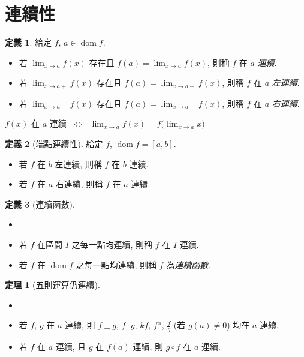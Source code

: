 \documentclass[12pt,a4paper]{extarticle}
\newcommand{\ds}{\displaystyle}
\newcommand{\ifff}{\;\Longleftrightarrow\;}
\DeclareMathOperator*{\dom}{dom}
\theoremstyle{definition}
\newtheorem*{dfn}{定義}
\newtheorem*{thm}{定理}
\begin{document}
\section*{連續性}

\begin{dfn} 給定 $f$, $a\in\dom f$. 
  \begin{itemize}\setlength\itemsep{0em}
    \item 若 $\ds\lim_{x\to a} f(x)$ 存在且 $\ds f(a)=\lim_{x\to a}f(x)$, 則稱 $f$ 在 $a$ \emph{連續}.  
    \item 若 $\ds\lim_{x\to a+} f(x)$ 存在且 $\ds f(a)=\lim_{x\to a+}f(x)$, 則稱 $f$ 在 $a$ \emph{左連續}.  
    \item 若 $\ds\lim_{x\to a-} f(x)$ 存在且 $\ds f(a)=\lim_{x\to a-}f(x)$, 則稱 $f$ 在 $a$ \emph{右連續}.  
  \end{itemize}
  $f(x)$ 在 $a$ 連續 $\ifff$ $\ds\lim_{x\to a}f(x) = f\big(\lim_{x\to a}x\big)$
\end{dfn}

\begin{dfn}[端點連續性]
  給定 $f$, $\dom f = [a, b]$.  
  \begin{multicols}{2}
    \begin{itemize}\setlength\itemsep{0em}
      \item 若 $f$ 在 $b$ 左連續, 則稱 $f$ 在 $b$ 連續.  
      \item 若 $f$ 在 $a$ 右連續, 則稱 $f$ 在 $a$ 連續.  
    \end{itemize}
  \end{multicols}
\end{dfn}

\begin{dfn}[連續函數] 
  \begin{itemize}\setlength\itemsep{0em}
    \item[]
    \item 若 $f$ 在區間 $I$ 之每一點均連續, 則稱 $f$ 在 $I$ 連續.  
    \item 若 $f$ 在 $\dom f$ 之每一點均連續, 則稱 $f$ 為\emph{連續函數}.  
  \end{itemize}
\end{dfn}

\begin{thm}[五則運算仍連續]
  \begin{itemize}\setlength\itemsep{0em}
    \item[] 
    \item 若 $f$, $g$ 在 $a$ 連續, 則 $f\pm g$, $f\cdot g$, $k f$, $f^\alpha$, $\ds\frac{f}{g}$ (若 $g(a)\ne 0$) 均在 $a$ 連續. 
    \item 若 $f$ 在 $a$ 連續, 且 $g$ 在 $f(a)$ 連續, 則 $g\circ f$ 在 $a$ 連續. 
  \end{itemize}
\end{thm}
\end{document}
